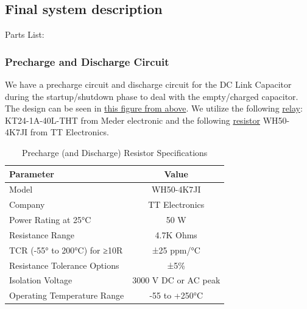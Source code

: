 \subsection{Final system description}
Parts List: \\




\subsubsection*{Precharge and Discharge Circuit}
We have a precharge circuit and discharge circuit for the DC Link Capacitor during the startup/shutdown phase to deal with the empty/charged capacitor. The design can be seen in \href{fig:HVSchematic}{this figure from above}.
We utilize the following \href{tab:precharge-relay-specs}{relay}: KT24-1A-40L-THT from Meder electronic and the following \href{tab:precharge-resistor}{resistor} WH50-4K7JI from TT Electronics.

\begin{table}[h] 
\begin{tabular}{|l|c|}
    \toprule
    Parameter & Value \\
    \midrule
    Model &  WH50-4K7JI \\
    Company & TT Electronics \\
    Power Rating at 25°C & 50 W \\
    Resistance Range & 4.7K Ohms \\
    TCR (-55° to 200°C) for ≥10R & ±25 ppm/°C \\
    Resistance Tolerance Options & ±5\% \\
    Isolation Voltage & 3000 V DC or AC peak \\
    Operating Temperature Range & -55 to +250°C \\
    \bottomrule
\end{tabular}
\label{tab:precharge-resistor}
\caption{Precharge (and Discharge) Resistor Specifications}
\end{table}

